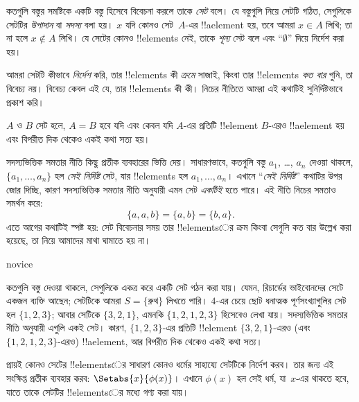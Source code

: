 \documentclass[../../../include/open-logic-section]{subfiles}
\begin{document}

কতগুলি বস্তুর সমষ্টিকে {একটি} বস্তু হিসেবে বিবেচনা করলে তাকে \emph{সেট} বলে।
যে বস্তুগুলি নিয়ে সেটটি গঠিত, সেগুলিকে সেটটির \emph{উপাদান} বা
\emph{সদস্য} বলা হয়। $x$ যদি কোনও সেট~$A$-এর !!a{element} হয়, তবে আমরা
$x \in A$ লিখি; তা না হলে $x \notin A$ লিখি। যে সেটের কোনও
!!{element}s নেই, তাকে \emph{শূন্য} সেট বলে এবং
``$\emptyset$'' দিয়ে নির্দেশ করা হয়।

\begin{explain}
আমরা সেটটি কীভাবে \emph{নির্দেশ} করি, তার !!{element}s কী \emph{ক্রমে}
সাজাই, কিংবা তার !!{element}s \emph{কত বার} গুনি, তা বিবেচ্য নয়।
বিবেচ্য কেবল এই যে, তার !!{element}s কী কী। নিচের নীতিতে আমরা
এই কথাটিই সুনির্দিষ্টভাবে প্রকাশ করি।
\end{explain}

\begin{defn}
  $A$ ও $B$ সেট হলে, $A = B$ হবে যদি এবং কেবল যদি
  $A$-এর প্রতিটি !!{element} $B$-এরও !!a{element} হয় এবং
  বিপরীত দিক থেকেও একই কথা সত্য হয়।
\end{defn}

সদস্যভিত্তিক সমতার নীতি কিছু প্রতীক ব্যবহারের ভিত্তি দেয়। সাধারণভাবে,
কতগুলি বস্তু $a_{1}$, \dots, $a_{n}$ দেওয়া থাকলে,
$\{a_{1}, \dots, a_{n}\}$ হল \emph{সেই নির্দিষ্ট} সেট, যার
!!{element}s হল $a_1, \ldots, a_n$। এখানে ``\emph{সেই নির্দিষ্ট}''
কথাটির উপর জোর দিচ্ছি, কারণ সদস্যভিত্তিক সমতার নীতি অনুযায়ী এমন সেট
\emph{একটিই} হতে পারে। এই নীতি নিচের সমতাও সমর্থন করে:
  \[
    \{a, a, b\} = \{a, b\} = \{b,a\}.
  \]
এতে আগের কথাটিই স্পষ্ট হয়: সেট বিবেচনার সময় তার !!{element}sের
ক্রম কিংবা সেগুলি কত বার উল্লেখ করা হয়েছে, তা নিয়ে আমাদের মাথা ঘামাতে হয় না।

\begin{tagblock}{novice}
\begin{ex}
কতগুলি বস্তু দেওয়া থাকলে, সেগুলিকে একত্র করে একটি সেট গঠন করা যায়।
যেমন, রিচার্ডের ভাইবোনদের সেটে একজন ব্যক্তি আছেন; সেটটিকে আমরা
$S=\{\textrm{রুথ}\}$ লিখতে পারি। $4$-এর চেয়ে ছোট ধনাত্মক পূর্ণসংখ্যাগুলির
সেট হল $\{1, 2, 3\}$; আবার সেটিকে $\{3, 2, 1\}$,
এমনকি $\{1, 2, 1, 2, 3\}$ হিসেবেও লেখা যায়। সদস্যভিত্তিক সমতার নীতি
অনুযায়ী এগুলি একই সেট। কারণ, $\{1, 2, 3\}$-এর প্রতিটি !!{element}
$\{3, 2, 1\}$-এরও (এবং $\{1, 2, 1, 2, 3\}$-এরও) !!a{element},
আর বিপরীত দিক থেকেও একই কথা সত্য।
\end{ex}
\end{tagblock}

প্রায়ই কোনও সেটের !!{element}sের সাধারণ কোনও ধর্মের সাহায্যে সেটটিকে
নির্দেশ করব। তার জন্য এই সংক্ষিপ্ত প্রতীক ব্যবহার করব:
$\Setabs{x}{\phi(x)}$। এখানে $\phi(x)$ হল সেই ধর্ম, যা~$x$-এর থাকতে হবে,
যাতে তাকে সেটটির !!{element}sের মধ্যে গণ্য করা যায়।
\end{document}
